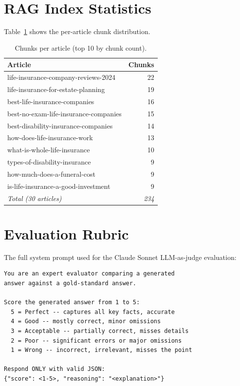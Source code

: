 \documentclass{article}
\begin{document}
\appendix
\section{RAG Index Statistics}
\label{app:index}

Table~\ref{tab:index_detail} shows the per-article chunk distribution.

\begin{table}[t]
\centering
\caption{Chunks per article (top 10 by chunk count).}
\label{tab:index_detail}
\small
\begin{tabular}{lr}
\toprule
\textbf{Article} & \textbf{Chunks} \\
\midrule
life-insurance-company-reviews-2024 & 22 \\
life-insurance-for-estate-planning & 19 \\
best-life-insurance-companies & 16 \\
best-no-exam-life-insurance-companies & 15 \\
best-disability-insurance-companies & 14 \\
how-does-life-insurance-work & 13 \\
what-is-whole-life-insurance & 10 \\
types-of-disability-insurance & 9 \\
how-much-does-a-funeral-cost & 9 \\
is-life-insurance-a-good-investment & 9 \\
\midrule
\textit{Total (30 articles)} & \textit{234} \\
\bottomrule
\end{tabular}
\end{table}

\section{Evaluation Rubric}
\label{app:rubric}

The full system prompt used for the Claude Sonnet LLM-as-judge evaluation:

\begin{lstlisting}
You are an expert evaluator comparing a generated
answer against a gold-standard answer.

Score the generated answer from 1 to 5:
  5 = Perfect -- captures all key facts, accurate
  4 = Good -- mostly correct, minor omissions
  3 = Acceptable -- partially correct, misses details
  2 = Poor -- significant errors or major omissions
  1 = Wrong -- incorrect, irrelevant, misses the point

Respond ONLY with valid JSON:
{"score": <1-5>, "reasoning": "<explanation>"}
\end{lstlisting}
\end{document}
